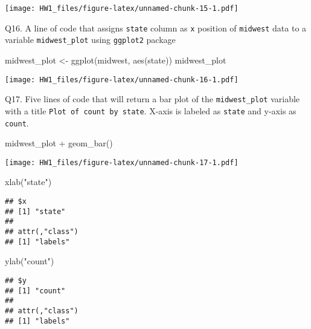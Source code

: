 \documentclass[
]{article}
\newenvironment{Shaded}{\begin{snugshade}}{\end{snugshade}}
\newcommand{\FunctionTok}[1]{\textcolor[rgb]{0.00,0.00,0.00}{#1}}
\newcommand{\NormalTok}[1]{#1}
\newcommand{\OtherTok}[1]{\textcolor[rgb]{0.56,0.35,0.01}{#1}}
\newcommand{\SpecialCharTok}[1]{\textcolor[rgb]{0.00,0.00,0.00}{#1}}
\newcommand{\StringTok}[1]{\textcolor[rgb]{0.31,0.60,0.02}{#1}}
\begin{document}
\texttt{[image: HW1\_files/figure-latex/unnamed-chunk-15-1.pdf]}

Q16. A line of code that assigns \texttt{state} column as \texttt{x}
position of \texttt{midwest} data to a variable \texttt{midwest\_plot}
using \texttt{ggplot2} package

\begin{Shaded}
\begin{Highlighting}[]
\NormalTok{midwest\_plot }\OtherTok{\textless{}{-}} \FunctionTok{ggplot}\NormalTok{(midwest, }\FunctionTok{aes}\NormalTok{(state))}
\NormalTok{midwest\_plot}
\end{Highlighting}
\end{Shaded}

\texttt{[image: HW1\_files/figure-latex/unnamed-chunk-16-1.pdf]}

Q17. Five lines of code that will return a bar plot of the
\texttt{midwest\_plot} variable with a title
\texttt{Plot\ of\ count\ by\ state}. X-axis is labeled as \texttt{state}
and y-axis as \texttt{count}.

\begin{Shaded}
\begin{Highlighting}[]
\NormalTok{midwest\_plot }\SpecialCharTok{+}
  \FunctionTok{geom\_bar}\NormalTok{()}
\end{Highlighting}
\end{Shaded}

\texttt{[image: HW1\_files/figure-latex/unnamed-chunk-17-1.pdf]}

\begin{Shaded}
\begin{Highlighting}[]
  \FunctionTok{xlab}\NormalTok{(}\StringTok{"state"}\NormalTok{)}
\end{Highlighting}
\end{Shaded}

\begin{verbatim}
## $x
## [1] "state"
## 
## attr(,"class")
## [1] "labels"
\end{verbatim}

\begin{Shaded}
\begin{Highlighting}[]
  \FunctionTok{ylab}\NormalTok{(}\StringTok{"count"}\NormalTok{)}
\end{Highlighting}
\end{Shaded}

\begin{verbatim}
## $y
## [1] "count"
## 
## attr(,"class")
## [1] "labels"
\end{verbatim}
\end{document}

